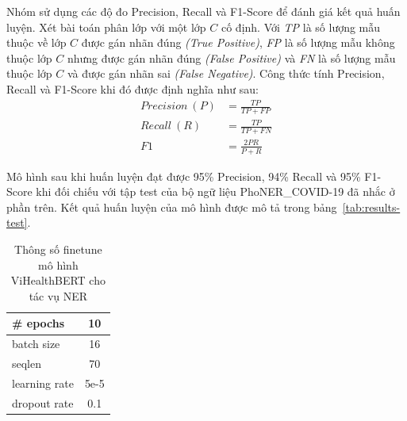Nhóm sử dụng các độ đo Precision, Recall và F1-Score để đánh giá kết quả huấn luyện. Xét bài toán phân lớp với một lớp $C$ cố định. Với \textit{TP} là số lượng mẫu thuộc về lớp $C$ được gán nhãn đúng \textit{(True Positive)}, \textit{FP} là số lượng mẫu không thuộc lớp $C$ nhưng được gán nhãn đúng \textit{(False Positive)} và \textit{FN} là số lượng mẫu thuộc lớp $C$ và được gán nhãn sai \textit{(False Negative)}. Công thức tính Precision, Recall và F1-Score khi đó được định nghĩa như sau:
\begin{equation}
\begin{aligned}
Precision~(P) &= \frac{TP}{TP + FP} \\
Recall~(R) &= \frac{TP}{TP + FN} \\
F1 &= \frac{2PR}{P + R}
\end{aligned}
\end{equation}

Mô hình sau khi huấn luyện đạt được 95\% Precision, 94\% Recall và 95\% F1-Score khi đối chiếu với tập test của bộ ngữ liệu PhoNER\_COVID-19 đã nhắc ở phần trên. Kết quả huấn luyện của mô hình được mô tả trong bảng~\ref{tab:results-test}.
\begin{table}
\centering
\begin{tabular}{|l|c|}
\hline
\# epochs & 10 \\
\hline
batch size & 16 \\
\hline
seqlen & 70 \\
\hline
learning rate & 5e-5 \\
\hline
dropout rate & 0.1 \\
\hline
\end{tabular}
\caption{Thông số finetune mô hình ViHealthBERT cho tác vụ NER}
\label{tab:configurations}
\end{table}

